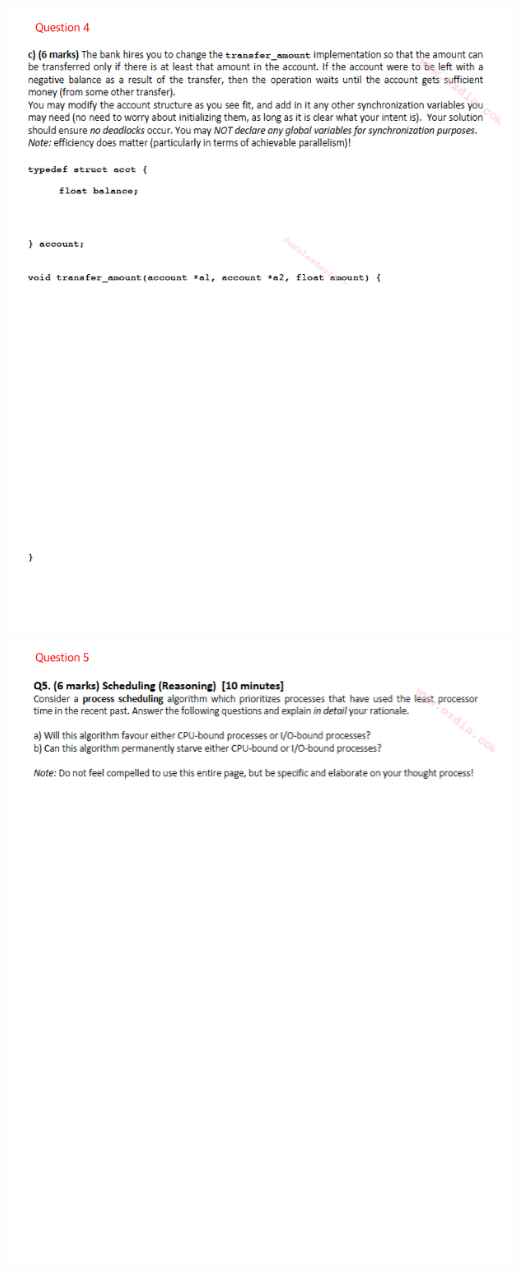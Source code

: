 \documentclass[12pt]{article}
\begin{document}
\begin{center}
    \includegraphics[width=\linewidth]{../images/midterm_5_4.png}
    \includegraphics[width=\linewidth]{../images/midterm_5_5.png}

\end{center}
\end{document}
